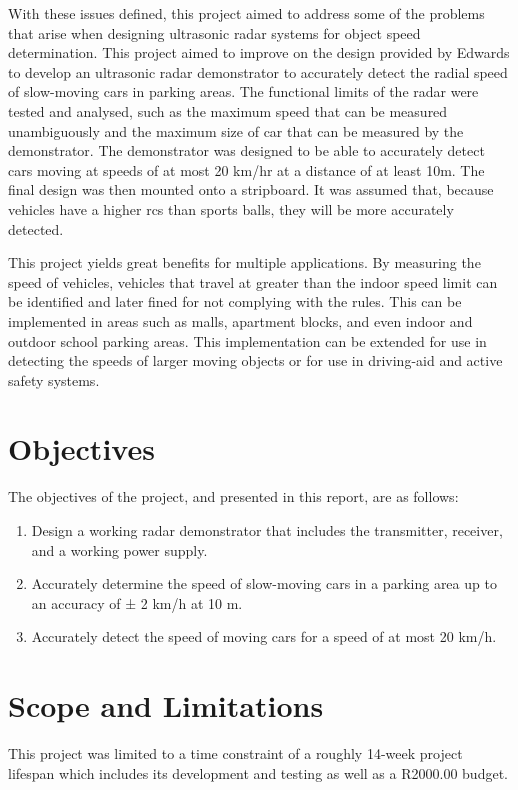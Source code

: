 \documentclass[class=report,11pt,crop=false]{standalone}
\begin{document}
With these issues defined, this project aimed to address some of the problems that arise when designing ultrasonic radar systems for object speed determination. This project aimed to improve on the design provided by Edwards \cite{ian} to develop an ultrasonic radar demonstrator to accurately detect the radial speed of slow-moving cars in parking areas. The functional limits of the radar were tested and analysed, such as the maximum speed that can be measured unambiguously and the maximum size of car that can be measured by the demonstrator. The demonstrator was designed to be able to accurately detect cars moving at speeds of at most 20 km/hr at a distance of at least 10m. The final design was then mounted onto a stripboard. It was assumed that, because vehicles have a higher \gls{rcs} than sports balls, they will be more accurately detected.

This project yields great benefits for multiple applications. By measuring the speed of vehicles, vehicles that travel at greater than the indoor speed limit can be identified and later fined for not complying with the rules. This can be implemented in areas such as malls, apartment blocks, and even indoor and outdoor school parking areas. This implementation can be extended for use in detecting the speeds of larger moving objects or for use in driving-aid and active safety systems.

\section{Objectives}
The objectives of the project, and presented in this report, are as follows:
\begin{enumerate}
    \item Design a working radar demonstrator that includes the transmitter, receiver, and a working power supply.
    \item Accurately determine the speed of slow-moving cars in a parking area up to an accuracy of ± 2 km/h at 10 m.
    \item Accurately detect the speed of moving cars for a speed of at most 20 km/h.
\end{enumerate}

\section{Scope and Limitations}
This project was limited to a time constraint of a roughly 14-week project lifespan which includes its development and testing as well as a R2000.00 budget.  
\end{document}
